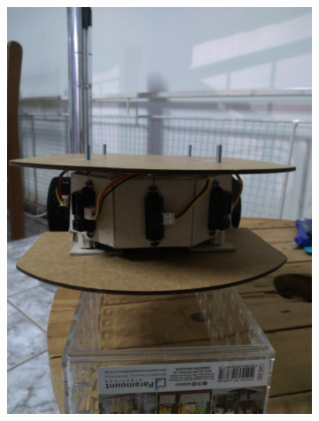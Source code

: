 \begin{figure}[!ht]
\begin{subfigure}[b]{0.49\textwidth}
		\includegraphics[trim={0cm 12.5cm 0cm 22.5cm}, clip, 
		scale=0.055]{Figuras/RoboMontagem6}%
	\end{subfigure}%
\end{figure}